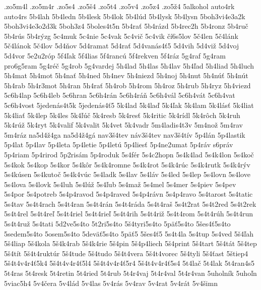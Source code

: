 {.zo5m4l
.zo5m4r
.zo5s4
.zo5\v s4
.zo5t4
.zo5v4
.zo5z4
.zo5\v z4
5alkohol
auto4rk
auto4rs
5b4lah
5b4ledn
5b4lesk
5b4lok
5b4l\'ud
5b4lysk
5b4lysn
5boh3vi4e3a2k
5boh3vi4e3o2d3k
5boh3z4
5boles4t5n
5b4ra\v t
5b4r\'azd
5b4rec2h
5b4ronz
5b4ru\v c
5b4r\'us
5b4r\'yzg
5c4muk
5c4nie
5c4vak
5c4vi\v c
5c4vik
\v c\'i6s5lov
5\v c4len
5\v c4l\'ank
5\v c4l\'anok
5\v c4lov
5d4\v nov
5d4ramat
5d4ra\v t
5d4van\'as4\v t5
5d4vih
5d4vi\v z
5d4voj
5d4vor
5e2u2r\'op
5f4\v lak
5f4lias
5f4ranc\'u
5f4rekven
5f4r\'az
5g4raf
5g4ram
pro6g5ram
5g4r\'e\v c
5g4rob
5g4vardej
5h4lad
5h4las
5h4lav
5h4\v lad
5h4liad
5h4luch
5h4mat
5h4mot
5h4na\v t
5h4ned
5h4nev
5h4niezd
5h4noj
5h4nut
5h4n\'u\v t
5h4n\'ut
5h4rab
5h4r3mot
5h4ran
5h4ra\v t
5h4rob
5h4rom
5h4roz
5h4rub
5h4ryz
5h4viezd
5c6h4lap
5c6h4leb
5c6hran
5c6h4r\'an
5c6h4r\'a\v n
5c6h4v\'al
5c6h4v\'at
5c6h4vat
5c6h4vost
5jeden\'as4t5k
5jeden\'as4\v t5
5k4lad
5k4la\v d
5k4\v lak
5k4lam
5k4l\'as\v t
5k4liat
5k4lia\v t
5k4lep
5k4les
5k4\v l\'u\v c
5k4resb
5k4res\v t
5k4ritic
5k4r\'idl
5k4r\^och
5k4ruh
5k4r\'u\v z
5k4ryt
5k4valif
5k4valit
5k4vet
5k4vadr
5m4ladis4t3v
5m4no\v z
5m4rav
5m4r\'az
na5d4\v z4ga
na5d4\v z4g\'a
nav3\v s4tev
n\'av3\v s4tev
nav3\v s4t\'iv
5p4l\'an
5p4lastik
5p4lat
5p4lav
5p4leta
5p4letie
5p4let\'u
5p4lies\v t
5p4ne2umat
5p4r\'av
s6pr\'av
5p4riam
5p4rirod
5p2ris\'am
5p4roduk
5s4f\'er
5s4c2hopn
5s4k4lad
5s4k4lon
5s4ko\v c
5s4kok
5s4kop
5s4kor
5s4k\^or
5s4k4romne
5s4k4rot
5s4k4r\'uc
5s4k4rutk
5s4k4r\'yv
5s4k\'usen
5s4kuto\v c
5s4k4v\'uc
5s4ladk
5s4lav
5s4l\'av
5s4led
5s4lep
5s4lovn
5s4love
5s4lova
5s4lovk
5s4luh
5s4l\'u\v z
5s4\v lub
5s4ma\v z
5s4mel
5s4mer
5s4piev
5s4pev
5s4por
5s4potreb
5s4p4ravod
5s4p4raved
5s4p4r\'avn
5s4p4ravo
5s4tarost
5s4tatic
5s4tav
5s4t4rach
5s4t4ran
5s4t4r\'an
5s4t4r\'ada
5s4t4ra\v s
5s4t2rat
5s4t2red
5s4t2rek
5s4t4rel
5s4t4re\v l
5s4t4riel
5s4t4rie\v l
5s4t4rih
5s4t4ri\v z
5s4t4rom
5s4t4r\'uh
5s4t4run
5s4t4ru\v z
5s4tati
5d2ve5s4to
5t2ri5s4to
5\v s4tyri5s4to
5p\"a\v t5s4to
5\v ses4\v t5s4to
5sedem5s4to
5osem5s4to
5dev\"a\v t5s4to
5p\"a\v t5
5\v ses4\v t5
5s4t4la
5s4tup
5s4ved
5\v s4\v lah
5\v s4liap
5\v s4kola
5\v s4k4rab
5\v s4k4rie
5\v s4pin
5\v s4p4liech
5\v s4print
5\v s4tart
5\v s4t\'at
5\v s4tep
5\v s4t\'it
5\v s4t4rukt\'ur
5\v s4tude
5\v s4tudo
5\v s4t4vera
5\v s4t4vorec
5\v s4tyli
5\v s4\v tast
5\v stiep4
5\v s4t4v4r4\v t5k4
5\v s4t4v4r4\v t5l4
5\v s4t4v4r4\v t5r4
5\v s4t4v4r4\v t5s4
5t4la\v c
5t4lak
5t4ran4s5
5t4ras
5t4resk
5t4retin
5t4ried
5t4rub
5t4r4vaj
5t4r4val
5t4r4van
5uholn\'ik
5uho\v ln
5viac5h4
5v4\v cera
5v4l\'ad
5v4las
5v4r\'as
5v4rav
5v4rat
5v4r\'at
5v4\v simn
}
